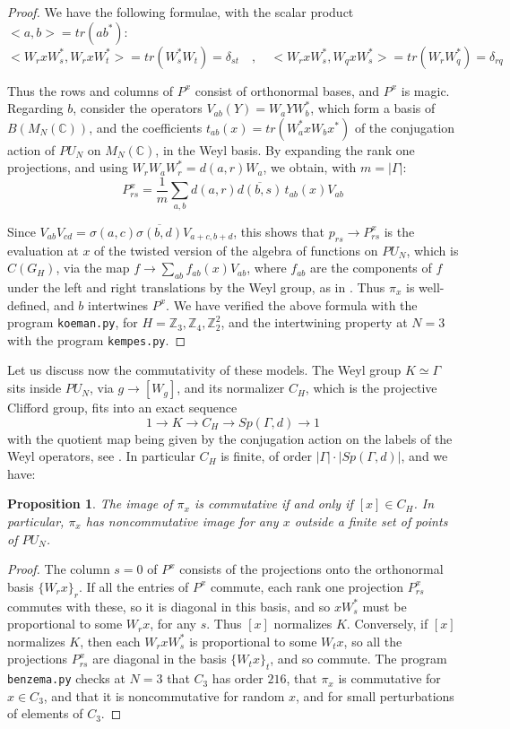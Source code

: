 \documentclass[11pt]{amsart}
\newtheorem{proposition}[theorem]{Proposition}
\theoremstyle{definition}
\begin{document}
\begin{proof}
We have the following formulae, with the scalar product $<a,b>=tr(ab^*)$:
$$<W_rxW_s^*,W_rxW_t^*>=tr(W_s^*W_t)=\delta_{st}\quad,\quad<W_rxW_s^*,W_qxW_s^*>=tr(W_rW_q^*)=\delta_{rq}$$

Thus the rows and columns of $P^x$ consist of orthonormal bases, and $P^x$ is magic. Regarding $b$, consider the operators $V_{ab}(Y)=W_aYW_b^*$, which form a basis of $B(M_N(\mathbb C))$, and the coefficients $t_{ab}(x)=tr(W_a^*xW_bx^*)$ of the conjugation action of $PU_N$ on $M_N(\mathbb C)$, in the Weyl basis. By expanding the rank one projections, and using $W_rW_aW_r^*=d(a,r)W_a$, we obtain, with $m=|\Gamma|$:
$$P^x_{rs}=\frac{1}{m}\sum_{a,b}d(a,r)\overline{d(b,s)}\,t_{ab}(x)V_{ab}$$

Since $V_{ab}V_{cd}=\sigma(a,c)\overline{\sigma(b,d)}V_{a+c,b+d}$, this shows that $p_{rs}\to P^x_{rs}$ is the evaluation at $x$ of the twisted version of the algebra of functions on $PU_N$, which is $C(G_H)$, via the map $f\to\sum_{ab}f_{ab}(x)V_{ab}$, where $f_{ab}$ are the components of $f$ under the left and right translations by the Weyl group, as in \cite[Theorem 4.11]{cte}. Thus $\pi_x$ is well-defined, and $b$ intertwines $P^x$. We have verified the above formula with the program {\tt koeman.py}, for $H=\mathbb Z_3,\mathbb Z_4,\mathbb Z_2^2$, and the intertwining property at $N=3$ with the program {\tt kempes.py}.
\end{proof}

Let us discuss now the commutativity of these models. The Weyl group $K\simeq\Gamma$ sits inside $PU_N$, via $g\to[W_g]$, and its normalizer $C_H$, which is the projective Clifford group, fits into an exact sequence
$$1\to K\to C_H\to Sp(\Gamma,d)\to1$$
with the quotient map being given by the conjugation action on the labels of the Weyl operators, see \cite{gal}. In particular $C_H$ is finite, of order $|\Gamma|\cdot|Sp(\Gamma,d)|$, and we have:

\begin{proposition}
The image of $\pi_x$ is commutative if and only if $[x]\in C_H$. In particular, $\pi_x$ has noncommutative image for any $x$ outside a finite set of points of $PU_N$.
\end{proposition}

\begin{proof}
The column $s=0$ of $P^x$ consists of the projections onto the orthonormal basis $\{W_rx\}_r$. If all the entries of $P^x$ commute, each rank one projection $P^x_{rs}$ commutes with these, so it is diagonal in this basis, and so $xW_s^*$ must be proportional to some $W_rx$, for any $s$. Thus $[x]$ normalizes $K$. Conversely, if $[x]$ normalizes $K$, then each $W_rxW_s^*$ is proportional to some $W_tx$, so all the projections $P^x_{rs}$ are diagonal in the basis $\{W_tx\}_t$, and so commute. The program {\tt benzema.py} checks at $N=3$ that $C_3$ has order $216$, that $\pi_x$ is commutative for $x\in C_3$, and that it is noncommutative for random $x$, and for small perturbations of elements of $C_3$.
\end{proof}
\end{document}
